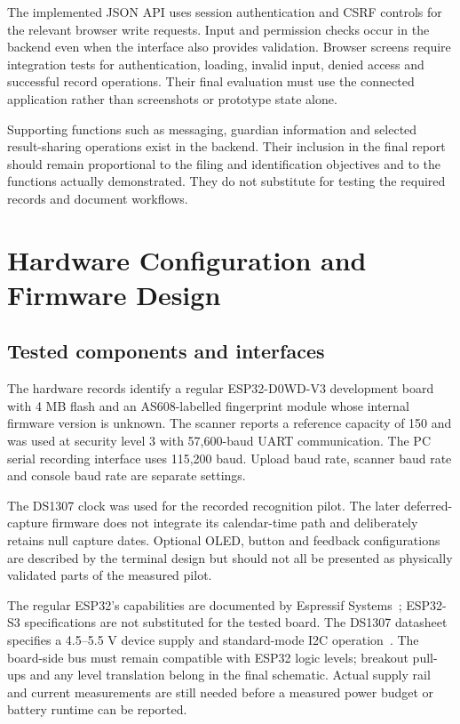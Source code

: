 The implemented JSON API uses session authentication and CSRF controls for the relevant browser write requests. Input and permission checks occur in the backend even when the interface also provides validation. Browser screens require integration tests for authentication, loading, invalid input, denied access and successful record operations. Their final evaluation must use the connected application rather than screenshots or prototype state alone.

Supporting functions such as messaging, guardian information and selected result-sharing operations exist in the backend. Their inclusion in the final report should remain proportional to the filing and identification objectives and to the functions actually demonstrated. They do not substitute for testing the required records and document workflows.

\section{Hardware Configuration and Firmware Design}\label{sec:3-7}

\subsection{Tested components and interfaces}\label{sec:3-7-1}

The hardware records identify a regular ESP32-D0WD-V3 development board with 4 MB flash and an AS608-labelled fingerprint module whose internal firmware version is unknown. The scanner reports a reference capacity of 150 and was used at security level 3 with 57,600-baud UART communication. The PC serial recording interface uses 115,200 baud. Upload baud rate, scanner baud rate and console baud rate are separate settings.

The DS1307 clock was used for the recorded recognition pilot. The later deferred-capture firmware does not integrate its calendar-time path and deliberately retains null capture dates. Optional OLED, button and feedback configurations are described by the terminal design but should not all be presented as physically validated parts of the measured pilot.




The regular ESP32's capabilities are documented by Espressif Systems~\cite{esp32}; ESP32-S3 specifications are not substituted for the tested board. The DS1307 datasheet specifies a 4.5--5.5 V device supply and standard-mode I2C operation~\cite{analogds1307}. The board-side bus must remain compatible with ESP32 logic levels; breakout pull-ups and any level translation belong in the final schematic. Actual supply rail and current measurements are still needed before a measured power budget or battery runtime can be reported.

